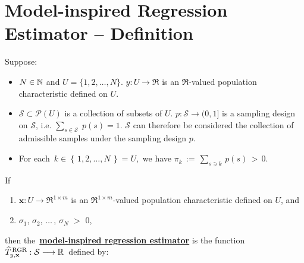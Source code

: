 

\section{Model-inspired Regression Estimator -- Definition}
\setcounter{theorem}{0}
\setcounter{equation}{0}


\renewcommand{\theenumi}{\roman{enumi}}
\renewcommand{\labelenumi}{\textnormal{(\theenumi)}$\;\;$}


\begin{definition}
\mbox{}
\vskip 0.15cm
\noindent
Suppose:
\begin{itemize}
\item
	$N \in \N$ and $U = \{1,2,\ldots,N\}$.
	\vskip 0.05cm
	$y : U \longrightarrow \Re$ is an $\Re$-valued population characteristic defined on $U$.
\item
	$\mathcal{S} \subset \mathcal{P}(U)$ is a collection of subsets of $U$.
	$p : \mathcal{S} \longrightarrow (0,1]$ is a sampling design on $\mathcal{S}$,
	i.e. $\underset{s\in\mathcal{S}}{\sum}\;p(s) = 1$.
	\vskip 0.05cm
	$\mathcal{S}$ can therefore be considered the collection of admissible samples under the sampling design $p$.
\item
	For each \,$k \in \left\{\,1,2,\ldots,N\,\right\} = U$,\, we have
	$\pi_{k} \,:=\, \underset{s \ni k}{\sum}\,p(s) \,>\, 0$.
\end{itemize}
\renewcommand{\theenumi}{\alph{enumi}}
\renewcommand{\labelenumi}{\textnormal{(\theenumi)}$\;\;$}
If
\begin{enumerate}
\item
	$\mathbf{x} : U \longrightarrow \Re^{1 \times m}$ is an $\Re^{1 \times m}$-valued
	population characteristic defined on $U$, and
\item
	$\sigma_{1}$, $\sigma_{2}$, $\ldots$\,, $\sigma_{N}$ $>$ $0$,
\end{enumerate}
\renewcommand{\theenumi}{\roman{enumi}}
\renewcommand{\labelenumi}{\textnormal{(\theenumi)}$\;\;$}
then the \,\underline{\textbf{model-inspired regression estimator}}\; is the function
\,$\widehat{T}^{\,\textnormal{RGR}}_{y,\mathbf{x}} : \mathcal{S} \longrightarrow \Re$\,
defined by:
\begin{equation*}

\end{equation*}
\end{definition}
